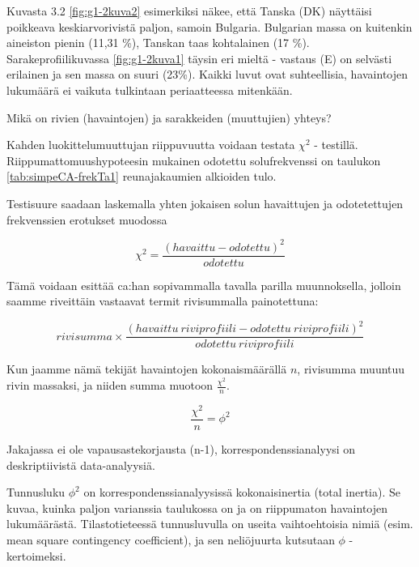 \documentclass[
  finnish,
]{book}
\begin{document}
Kuvasta 3.2 \ref{fig:g1-2kuva2} esimerkiksi näkee, että Tanska (DK) näyttäisi
poikkeava keskiarvorivistä paljon, samoin Bulgaria.
Bulgarian massa on kuitenkin aineiston pienin (11,31 \%), Tanskan taas
kohtalainen (17 \%).
Sarakeprofiilikuvassa \ref{fig:g1-2kuva1} täysin eri mieltä - vastaus (E) on
selvästi erilainen ja sen massa on suuri (23\%). Kaikki luvut ovat suhteellisia,
havaintojen lukumäärä ei vaikuta tulkintaan periaatteessa mitenkään.

Mikä on rivien (havaintojen) ja sarakkeiden (muuttujien) yhteys?

Kahden luokittelumuuttujan riippuvuutta voidaan testata \(\chi^{2}\) - testillä.
Riippumattomuushypoteesin mukainen odotettu solufrekvenssi on taulukon
\ref{tab:simpeCA-frekTa1} reunajakaumien alkioiden tulo.

Testisuure saadaan laskemalla yhten jokaisen solun havaittujen ja odotetettujen
frekvenssien erotukset muodossa

\begin{equation}
  \chi^{2} = \frac{(havaittu - odotettu)^2} {odotettu}
    \label{eq:khii21}
\end{equation}

Tämä voidaan esittää ca:han sopivammalla tavalla parilla muunnoksella, jolloin
saamme riveittäin vastaavat termit rivisummalla painotettuna:

\begin{equation}
  rivisumma \times \frac{(havaittu \: riviprofiili - odotettu \: riviprofiili)^2} {odotettu \: riviprofiili}
    \label{eq:khii22}
\end{equation}

Kun jaamme nämä tekijät havaintojen kokonaismäärällä \(n\), rivisumma muuntuu
rivin massaksi, ja niiden summa muotoon \(\frac{\chi^{2}}{n}\).

\begin{equation}
 \frac{\chi^{2}}{n} = \phi^{2}
  \label{eq:inert1}
 \end{equation}

Jakajassa ei ole vapausastekorjausta (n-1), korrespondenssianalyysi on
deskriptiivistä data-analyysiä.

Tunnusluku \(\phi^{2}\) on korrespondenssianalyysissä kokonaisinertia (total
inertia). Se kuvaa, kuinka paljon varianssia taulukossa on ja on riippumaton
havaintojen lukumäärästä. Tilastotieteessä tunnusluvulla on useita vaihtoehtoisia
nimiä (esim. mean square contingency coefficient), ja sen neliöjuurta kutsutaan
\(\phi\) - kertoimeksi.
\end{document}
